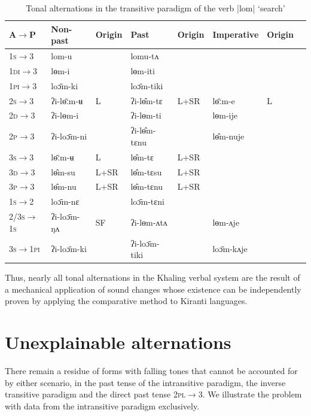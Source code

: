 \documentclass[oldfontcommands,oneside,a4paper,11pt]{article}
\newcommand{\ipa}[1]{{\phon \mbox{#1}}} %
\begin{document}
\begin{table}[h]
\caption{Tonal alternations in the transitive paradigm of the verb |\ipa{lom}| `search' } \label{tab:trans.paradigm3} \centering
\begin{tabular}{llllllll}
\toprule
A$\rightarrow$P& Non-past & Origin & Past & Origin& Imperative& Origin\\
\midrule
\textsc{1s}$\rightarrow$3 & \ipa{lom-u} & & \ipa{lomu-tʌ} &  &  \\
\textsc{1di}$\rightarrow$3 & \ipa{lɵm-i} &  & \ipa{lɵm-iti}  & \\
\textsc{1pi}$\rightarrow$3 & \ipa{loɔ̄m-ki} &  & \ipa{loɔ̄m-tiki} \\
\textsc{2s}$\rightarrow$3 & \ipa{ʔi-lɵ̄ːm-ʉ} & L  & \ipa{ʔi-lɵ̂m-tɛ} &L+SR  &\ipa{lɵ̄ːm-e} & L\\
\textsc{2d}$\rightarrow$3 & \ipa{ʔi-lɵm-i} & &  \ipa{ʔi-lɵm-ti} & & \ipa{lɵm-ije} & \\
\textsc{2p}$\rightarrow$3 & \ipa{ʔi-loɔ̄m-ni} &  & \ipa{ʔi-lɵ̂m-tɛnu} &  &\ipa{lɵ̂m-nuje} &\\
\textsc{3s}$\rightarrow$3 & \ipa{lɵ̄ːm-ʉ} & L &\ipa{lɵ̂m-tɛ} & L+SR\\
\textsc{3d}$\rightarrow$3 & \ipa{lɵ̂m-su} &L+SR& \ipa{lɵ̂m-tɛsu}   & L+SR\\
\textsc{3p}$\rightarrow$3 & \ipa{lɵ̂m-nu} & L+SR& \ipa{lɵ̂m-tɛnu} & L+SR\\
\midrule
\textsc{1s}$\rightarrow$2 & \ipa{loɔ̄m-nɛ} & & \ipa{loɔ̄m-tɛni} & \\
\textsc{2/3s$\rightarrow$1s} & \ipa{ʔi-loɔ̄m-ŋʌ} &SF &\ipa{ʔi-lɵm-ʌtʌ} & &\ipa{lɵm-ʌje}\\
\textsc{3s$\rightarrow$1pi} & \ipa{ʔi-loɔ̄m-ki} & &\ipa{ʔi-loɔ̄m-tiki} & &\ipa{loɔ̄m-kʌje}\\
\bottomrule
\end{tabular}
\end{table}


Thus, nearly all tonal alternations in the Khaling verbal system are the result of a mechanical application of sound changes whose existence can be independently proven by applying the comparative method to Kiranti languages.

\section{Unexplainable alternations}

There remain a residue of forms with falling tones that cannot be accounted for by either scenario, in the past tense of the intransitive paradigm, the  inverse transitive paradigm and the direct past tense \textsc{2pl$\rightarrow$3}. We illustrate the problem with data from the intransitive paradigm exclusively.
\end{document}
